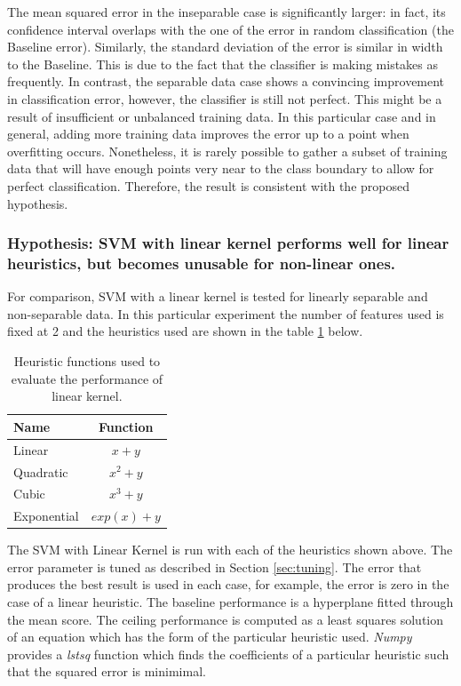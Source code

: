 \documentclass[12pt,notitlepage,twoside]{scrreprt}
\begin{document}
The mean squared error in the inseparable case is significantly larger: in fact, its
confidence interval overlaps with the one of the error in random classification (the
Baseline error). Similarly, the standard deviation of the error is similar in width to the
Baseline. This is due to the fact that the classifier is making mistakes as frequently. In
contrast, the separable data case shows a convincing improvement in classification error,
however, the classifier is still not perfect. This might be a result of insufficient
or unbalanced training data. In this particular case and in general, adding more training
data improves the error up to a point when overfitting occurs. Nonetheless, it is rarely
possible to gather a subset of training data that will have enough points very near to the class
boundary to allow for perfect classification. Therefore, the result is consistent with the
proposed hypothesis.
\subsubsection*{Hypothesis: SVM with linear kernel performs well for linear heuristics, but becomes
unusable for non-linear ones.}


For comparison, SVM with a linear kernel is tested for linearly separable and
non-separable data. In this particular experiment the number of features used is fixed at
2 and the heuristics used are shown in the table \ref{linkern} below. 

\begin{table}[h!]
	\centering
	\begin{tabular}[h!]{l|c}
		\hline
		Name & Function \\ \hline
		Linear & \(x+y\)\\ \hline
		Quadratic & \(x^2+y\)\\ \hline
		Cubic & \(x^3+y\)\\ \hline
		Exponential & \(exp(x)+y\)\\ \hline
	\end{tabular}
	\caption{Heuristic functions used to evaluate the performance of linear kernel.
		\label{linkern}}
\end{table}

The SVM with Linear Kernel is run with each of the heuristics shown above. The error
parameter is tuned as described in Section \ref{sec:tuning}. The error that produces
the best result is used in each case, for example, the error is zero in the
case of a linear heuristic. The baseline performance is a hyperplane fitted through the
mean score. The ceiling performance is computed as a least squares solution of an equation
which has the form of the particular heuristic used. \textit{Numpy} provides a
\textit{lstsq} function which finds the coefficients of a particular heuristic such that
the squared error is minimimal.
\end{document}
